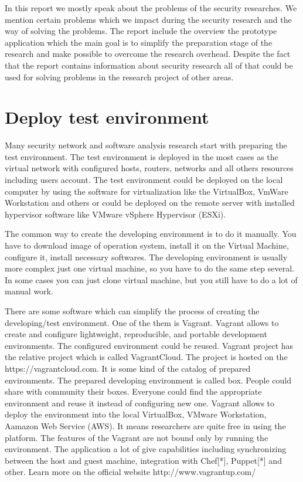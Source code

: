 \documentclass[twoside]{article}
\begin{document}
In this report we mostly speak about the problems of the security researches. We mention certain problems which we impact during the security research and the way of solving the problems. The report include the overview the prototype application which the main goal is to simplify the preparation stage of the research and make possible to overcome the research overhead. Despite the fact that the report contains information about security research all of that could be used for solving problems in the research project of other areas.      


\section{Deploy test environment}
Many security network and software analysis research start with preparing the test environment. The test environment is deployed in the most cases as the virtual network with configured hosts, routers, networks and all others resources including users account. The test environment could be deployed on the local computer by using the software for virtualization like the VirtualBox, VmWare Workstation and others or could be deployed on the remote server with installed hypervisor software like VMware vSphere Hypervisor (ESXi).          

The common way to create the developing environment is to do it manually. You have to download image of operation system, install it on the Virtual Machine, configure it, install necessary softwares. The developing environment is usually more complex just one virtual machine, so you have to do the same step several. In some cases you can just clone virtual machine, but you still have to do a lot of manual work.       
  
There are some software which can simplify the process of creating the developing/test environment. One of the them is Vagrant. Vagrant allows to create and configure lightweight, reproducible, and portable development environments. The configured environment could be reused. Vagrant project has the relative project which is called VagrantCloud. The project is hosted on the https://vagrantcloud.com. It is some kind of the catalog of prepared environments. The prepared developing environment is called box.  People could share with community their boxes. Everyone could find the appropriate environment and reuse it instead of configuring new one. Vagrant allows to deploy the environment into the local VirtualBox, VMware Workstation, Aamazon Web Service (AWS). It means researchers are quite free in using the platform. The features of the Vagrant are not bound only by running the environment. The application a lot of give capabilities including synchronizing between the host and guest machine, integration with Chef[*], Puppet[*] and other. Learn more on the official website http://www.vagrantup.com/ 
\end{document}
